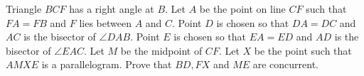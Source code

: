 Triangle 
$BCF$
 has a right angle at 
$B$. 
 Let 
$A$
 be the point on line 
$CF$
 such that 
$FA=FB$
 and 
$F$
 lies between 
$A$
 and 
$C$. 
 Point 
$D$
 is chosen so that 
$DA=DC$
 and 
$AC$
 is the bisector of 
$\angle{DAB}$. 
 Point 
$E$
 is chosen so that 
$EA=ED$
 and 
$AD$
 is the bisector of 
$\angle{EAC}$. 
 Let 
$M$
 be the midpoint of 
$CF$. 
 Let 
$X$
 be the point such that 
$AMXE$
 is a parallelogram. Prove that 
$BD,FX$
 and 
$ME$
 are concurrent.
